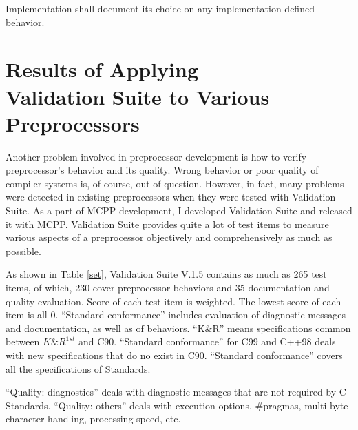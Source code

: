 \documentclass[twocolumn]{article}
\begin{document}
Implementation shall document its choice on any implementation-defined behavior.

\section{Results of Applying\\
Validation Suite to Various\\
 Preprocessors}

Another problem involved in preprocessor development is how to verify preprocessor's behavior and its quality.  Wrong behavior or poor quality of compiler systems is, of course, out of question.  However, in fact, many problems were detected in existing preprocessors when they were tested with Validation Suite.  As a part of MCPP development, I developed Validation Suite and released it with MCPP\@.  Validation Suite provides quite a lot of test items to measure various aspects of a preprocessor objectively and comprehensively as much as possible.

As shown in Table \ref{set}, Validation Suite V.1.5 contains as much as 265 test items, of which, 230 cover preprocessor behaviors and 35 documentation and quality evaluation.  Score of each test item is weighted.  The lowest score of each item is all 0. 
``Standard conformance'' includes evaluation of diagnostic messages and documentation, as well as of behaviors.  
``K\&R'' means specifications common between $K\&R^{1st}$ and C90.  
``Standard conformance'' for C99 and C++98 deals with new specifications that do no exist in C90.  
``Standard conformance'' covers all the specifications of Standards.

``Quality: diagnostics'' deals with diagnostic messages that are not required by C Standards.  ``Quality: others'' deals with execution options, \#pragmas, multi-byte character handling, processing speed, etc.

\begin{table}
\end{table}
\end{document}
